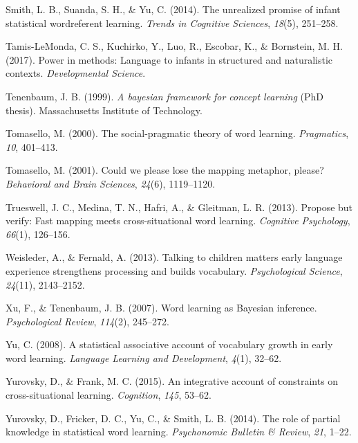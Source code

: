 \documentclass[english,floatsintext,man]{apa6}
\theoremstyle{definition}
\theoremstyle{definition}
\theoremstyle{definition}
\theoremstyle{remark}
\begin{document}
\hypertarget{ref-smith2014}{}
Smith, L. B., Suanda, S. H., \& Yu, C. (2014). The unrealized promise of
infant statistical wordreferent learning. \emph{Trends in Cognitive
Sciences}, \emph{18}(5), 251--258.

\hypertarget{ref-tamis-lemonda2017}{}
Tamis-LeMonda, C. S., Kuchirko, Y., Luo, R., Escobar, K., \& Bornstein,
M. H. (2017). Power in methods: Language to infants in structured and
naturalistic contexts. \emph{Developmental Science}.

\hypertarget{ref-tenenbaum1999}{}
Tenenbaum, J. B. (1999). \emph{A bayesian framework for concept
learning} (PhD thesis). Massachusetts Institute of Technology.

\hypertarget{ref-tomasello2000}{}
Tomasello, M. (2000). The social-pragmatic theory of word learning.
\emph{Pragmatics}, \emph{10}, 401--413.

\hypertarget{ref-tomasello2001}{}
Tomasello, M. (2001). Could we please lose the mapping metaphor, please?
\emph{Behavioral and Brain Sciences}, \emph{24}(6), 1119--1120.

\hypertarget{ref-trueswell2013}{}
Trueswell, J. C., Medina, T. N., Hafri, A., \& Gleitman, L. R. (2013).
Propose but verify: Fast mapping meets cross-situational word learning.
\emph{Cognitive Psychology}, \emph{66}(1), 126--156.

\hypertarget{ref-weisleder2013}{}
Weisleder, A., \& Fernald, A. (2013). Talking to children matters early
language experience strengthens processing and builds vocabulary.
\emph{Psychological Science}, \emph{24}(11), 2143--2152.

\hypertarget{ref-xu2007}{}
Xu, F., \& Tenenbaum, J. B. (2007). Word learning as Bayesian inference.
\emph{Psychological Review}, \emph{114}(2), 245--272.

\hypertarget{ref-yu2008}{}
Yu, C. (2008). A statistical associative account of vocabulary growth in
early word learning. \emph{Language Learning and Development},
\emph{4}(1), 32--62.

\hypertarget{ref-yurovsky2015}{}
Yurovsky, D., \& Frank, M. C. (2015). An integrative account of
constraints on cross-situational learning. \emph{Cognition}, \emph{145},
53--62.

\hypertarget{ref-yurovsky2014}{}
Yurovsky, D., Fricker, D. C., Yu, C., \& Smith, L. B. (2014). The role
of partial knowledge in statistical word learning. \emph{Psychonomic
Bulletin \& Review}, \emph{21}, 1--22.
\end{document}

